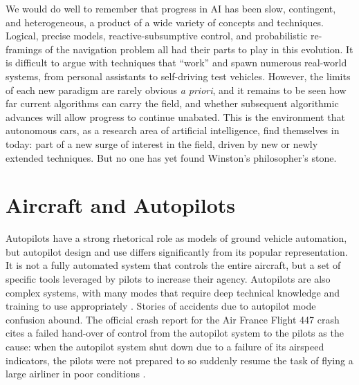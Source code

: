 We would do well to remember that 
progress in AI has been slow, contingent, and heterogeneous, a product of a
wide variety of concepts and techniques. Logical, precise models,
reactive-subsumptive control, and probabilistic re-framings of the
navigation problem all had their parts to play in this evolution. It
is difficult to argue with techniques that ``work'' and
spawn numerous real-world systems, from personal assistants to
self-driving test vehicles. However, the limits of each new paradigm are rarely
obvious \emph{a priori}, and it remains to be seen how far current
algorithms can carry the field, and whether subsequent algorithmic
advances will allow progress to continue unabated. This is the
environment that autonomous cars, as a 
research area of artificial intelligence, find themselves in today:
part of a new surge of interest in the field, driven by new
or newly extended techniques. But no one has yet found Winston's
philosopher's stone.


\section{Aircraft and Autopilots}



Autopilots have a strong rhetorical role as
models of ground vehicle automation, but autopilot design and use differs 
significantly from its popular representation. It is not a fully automated
system that controls the entire aircraft, but a set of specific tools
leveraged by pilots to increase their agency. Autopilots are also complex systems, with many modes
that require deep technical knowledge and training to use
appropriately \cite{harrisPsych}. Stories of accidents
due to autopilot mode confusion abound. The official crash report for
the Air France Flight 447 crash cites a
failed hand-over of control from the autopilot system to the pilots as
the cause:
when the autopilot system shut down due to a failure of its airspeed
indicators, the pilots were not prepared to so suddenly resume the
task of flying a large airliner in poor conditions \cite{AF447}.

